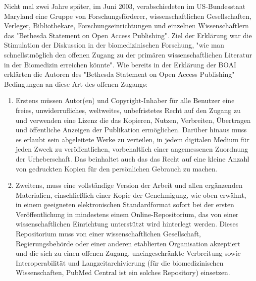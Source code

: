 {Nicht mal zwei Jahre später, im Juni 2003, verabschiedeten im US-Bundesstaat Maryland eine Gruppe von Forschungsförderer, wissenschaftlichen Gesellschaften, Verleger, Bibliothekare, Forschungseinrichtungen und einzelnen Wissenschaftlern das "Bethesda Statement on Open Access Publishing".\cite{suchen} Ziel der Erklärung war die Stimulation der Diskussion in der biomedizinischen Forschung, "wie man schnellstmöglich den offenen Zugang zu der primären wissenschaftlichen Literatur in der Biomedizin erreichen könnte"\cite{suchen}. Wie bereits in der Erklärung der BOAI erklärten die Autoren des "Bethesda Statement on Open Access Publishing" Bedingungen an diese Art des offenen Zugangs\cite{suchen}:
\begin{enumerate}
\item Erstens müssen Autor(en) und Copyright-Inhaber für alle Benutzer eine freies, unwiderrufliches, weltweites, unbefristetes Recht auf den Zugang zu und verwenden eine Lizenz die das Kopieren, Nutzen, Verbreiten, Übertragen und öffentliche Anzeigen der Publikation ermöglichen. Darüber hinaus muss es erlaubt sein abgeleitete Werke zu verteilen, in jedem digitalen Medium für jeden Zweck zu veröffentlichen, vorbehaltlich einer angemessenen Zuordnung der Urheberschaft. Das beinhaltet auch das das Recht auf eine kleine Anzahl von gedruckten Kopien für den persönlichen Gebrauch zu machen. 
\item Zweitens, muss eine vollständige Version der Arbeit und allen ergänzenden Materialien, einschließlich einer Kopie der Genehmigung, wie oben erwähnt, in einem geeigneten elektronischen Standardformat sofort bei der ersten Veröffentlichung in mindestens einem Online-Repositorium, das von einer wissenschaftlichen Einrichtung unterstützt wird hinterlegt werden. Dieses Repositorium muss von einer wissenschaftlichen Gesellschaft, Regierungsbehörde oder einer anderen etablierten Organisation akzeptiert und die sich zu einen offenen Zugang, uneingeschränkte Verbreitung sowie Interoperabilität und Langzeitarchivierung (für die biomedizinischen Wissenschaften, PubMed Central ist ein solches Repository) einsetzen.
\end{enumerate}

}
